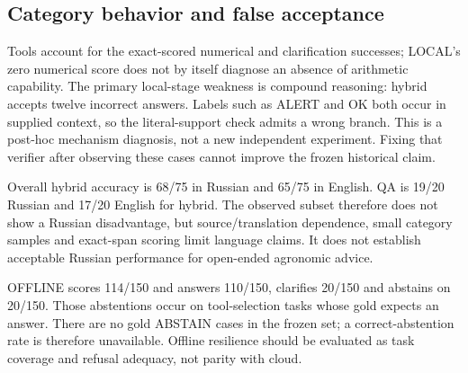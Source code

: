\documentclass[10pt,a4paper,twocolumn]{article}
\begin{document}
\subsection{Category behavior and false acceptance}

\begin{table}[t]
\centering\small
\caption{Correct decisions by category. Shared source/scenario variants are correlated observations.}
\end{table}


Tools account for the exact-scored numerical and clarification successes; LOCAL's zero numerical score does not by itself diagnose an absence of arithmetic capability. The primary local-stage weakness is compound reasoning: hybrid accepts twelve incorrect answers. Labels such as ALERT and OK both occur in supplied context, so the literal-support check admits a wrong branch. This is a post-hoc mechanism diagnosis, not a new independent experiment. Fixing that verifier after observing these cases cannot improve the frozen historical claim.

Overall hybrid accuracy is 68/75 in Russian and 65/75 in English. QA is 19/20 Russian and 17/20 English for hybrid. The observed subset therefore does not show a Russian disadvantage, but source/translation dependence, small category samples and exact-span scoring limit language claims. It does not establish acceptable Russian performance for open-ended agronomic advice.

OFFLINE scores 114/150 and answers 110/150, clarifies 20/150 and abstains on 20/150. Those abstentions occur on tool-selection tasks whose gold expects an answer. There are no gold ABSTAIN cases in the frozen set; a correct-abstention rate is therefore unavailable. Offline resilience should be evaluated as task coverage and refusal adequacy, not parity with cloud.
\end{document}
